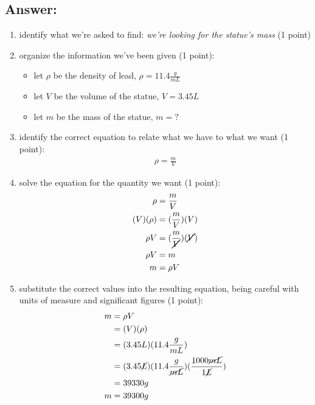 \documentclass[11pt, oneside]{article}   	%
\begin{document}
\subsection*{Answer:}
\begin{enumerate}
\item identify what we're asked to find: \emph{we're looking for the statue's mass} (1 point)
\item organize the information we've been given (1 point):
\begin{itemize}
\item let $\rho$ be the density of lead, $\rho = 11.4 \frac{g}{mL}$
\item let $V$ be the volume of the statue, $V = 3.45 L$
\item let $m$ be the mass of the statue, $m = ?$
\end{itemize}
\item identify the correct equation to relate what we have to what we want (1 point):
\begin{equation} 
\begin{split}
       \rho = \frac{m}{V}
 \end{split}
 \end{equation}
 
 \item solve the equation for the quantity we want (1 point):
 \begin{equation} 
\begin{split}
       \rho        &= \frac{m}{V} \\
       (V)(\rho) &=  (\frac{m}{V})(V) \\
       \rho V     &=  (\frac{m}{\cancel{V}})(\cancel{V}) \\
       \rho V     &=  m \\
       m            &= \rho V
 \end{split}
 \end{equation}
 
 \item substitute the correct values into the resulting equation, being careful with units of measure and significant figures (1 point):
\begin{equation} 
\begin{split}
       m            &= \rho V \\
                      &= (V)(\rho) \\
                      &= (3.45 L)(11.4 \frac{g}{mL}) \\
                      &= (3.45 \cancel{L})(11.4 \frac{g}{\cancel{mL}})(\frac{1000 \cancel{mL}}{1 \cancel{L}}) \\
                      &= 39330 g \\
       m            &= 39300 g 
 \end{split}
 \end{equation}
 \end{enumerate}
\end{document}
